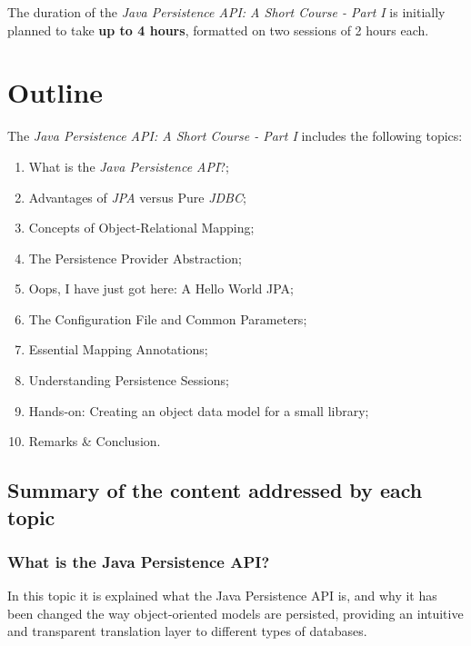 \documentclass[12pt,a4paper]{article}
\begin{document}
The duration of the \textit{Java Persistence API: A Short Course - Part I} is initially planned to take \textbf{up to 4 hours}, formatted on two sessions of 2 hours each.

\section{Outline}

The  \textit{Java Persistence API: A Short Course - Part I} includes the following topics:

\begin{enumerate}
\item What is the \textit{Java Persistence API}?;

\item Advantages of \textit{JPA} versus Pure \textit{JDBC};

\item Concepts of Object-Relational Mapping;

\item The Persistence Provider Abstraction;

\item Oops, I have just got here: A Hello World JPA;

\item The Configuration File and Common Parameters;

\item Essential Mapping Annotations;

\item Understanding Persistence Sessions;

\item Hands-on: Creating an object data model for a small library;

\item Remarks \& Conclusion.

\end{enumerate}

\subsection{Summary of the content addressed by each topic}

\subsubsection{What is the Java Persistence API?}

In this topic it is explained what the Java Persistence API is, and why it has been changed the way object-oriented models are persisted, providing an intuitive and transparent translation layer to different types of databases.
\end{document}
